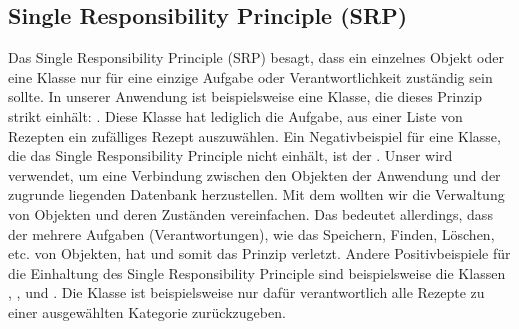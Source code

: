 \subsection{Single Responsibility Principle (SRP)}
Das Single Responsibility Principle (SRP) besagt, dass ein einzelnes Objekt oder eine Klasse nur für eine einzige Aufgabe oder Verantwortlichkeit zuständig sein  sollte.
In unserer Anwendung ist beispielsweise eine Klasse, die dieses Prinzip strikt einhält: \href{https://github.com/MichaelaHaag/RezeptApp/blob/main/1-Adapter/src/main/java/de/rezeptapp/adapter/GUIFunktionen/FunktionenZufallsGenerator.java}{}. Diese Klasse hat lediglich die Aufgabe, aus einer Liste von Rezepten ein \glqq zufälliges\grqq{} Rezept auszuwählen. 
Ein Negativbeispiel für eine Klasse, die das Single Responsibility Principle nicht einhält, ist der \href{https://github.com/MichaelaHaag/RezeptApp/blob/main/1-Adapter/src/main/java/de/rezeptapp/adapter/Datenpersistenz/EntityManager.java}{}. Unser  wird verwendet, um eine Verbindung zwischen den Objekten der Anwendung und der zugrunde liegenden Datenbank herzustellen. Mit dem  wollten wir die Verwaltung von Objekten und deren Zuständen vereinfachen. Das bedeutet allerdings, dass der  mehrere Aufgaben (Verantwortungen), wie das Speichern, Finden, Löschen, etc. von Objekten, hat und somit das Prinzip verletzt. 
Andere Positivbeispiele für die Einhaltung des Single Responsibility Principle sind beispielsweise die Klassen \href{https://github.com/MichaelaHaag/RezeptApp/blob/main/1-Adapter/src/main/java/de/rezeptapp/adapter/GUIFunktionen/FunktionenRezeptBearbeiten.java}{}, \href{https://github.com/MichaelaHaag/RezeptApp/blob/main/1-Adapter/src/main/java/de/rezeptapp/adapter/GUIFunktionen/FunktionenNeuesRezept.java}{}, \href{https://github.com/MichaelaHaag/RezeptApp/blob/main/1-Adapter/src/main/java/de/rezeptapp/adapter/GUIFunktionen/ButtonRenderer.java}{} und \href{https://github.com/MichaelaHaag/RezeptApp/blob/main/1-Adapter/src/main/java/de/rezeptapp/adapter/GUIFunktionen/FunktionenListenÜbersicht.java}{}. Die Klasse  ist beispielsweise nur dafür verantwortlich alle Rezepte zu einer ausgewählten Kategorie zurückzugeben. 

